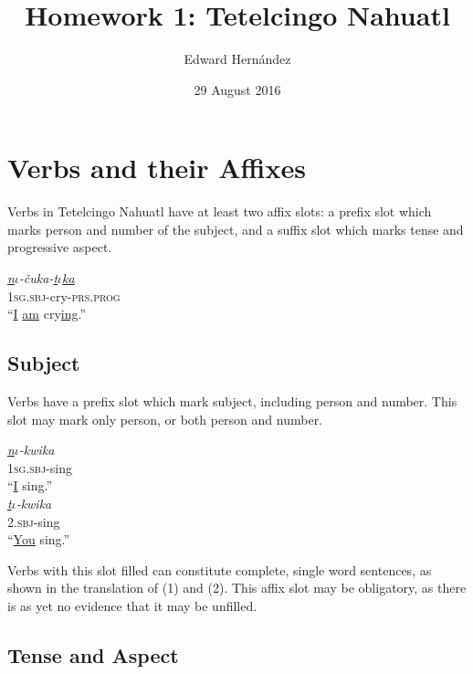 \documentclass[doc,12pt]{apa6}
\begin{document}
\title{Homework 1: Tetelcingo Nahuatl}
\author{Edward Hern\'{a}ndez}
\date{29 August 2016}
\maketitle

\setcounter{secnumdepth}{3}

\section{Verbs and their Affixes}

Verbs in Tetelcingo Nahuatl have at least two affix slots: a prefix slot which
marks person and number of the subject, and a suffix slot which marks tense and
progressive aspect.

\begin{exe}
	\ex 
	\gll \textit{\underline{n$\iota$}-\v{c}uka-\underline{t$\iota$ka}} \\
	\textsc{1sg.sbj}-cry-\textsc{prs.prog} \\
	\trans ``\underline{I} \underline{am} cry\underline{ing}.''
\end{exe}

\subsection{Subject}

Verbs have a prefix slot which mark subject, including person and number. This
slot may mark only person, or both person and number.

\begin{exe}
	\ex 
	\gll \textit{\underline{n$\iota$}-kwika} \\
	\textsc{1sg.sbj}-sing \\
	\trans ``\underline{I} sing.'' \\
	\ex 
	\gll \textit{\underline{t$\iota$}-kwika} \\
	\textsc{2.sbj}-sing \\
	\trans ``\underline{You} sing.''
\end{exe}

Verbs with this slot filled can constitute complete, single word sentences, as
shown in the translation of (1) and (2). This affix slot may be obligatory, as
there is as yet no evidence that it may be unfilled.

\subsection{Tense and Aspect}
\end{document}
